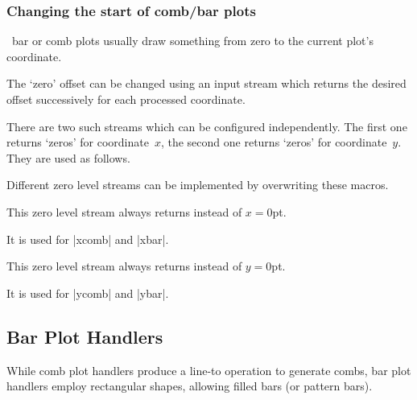 \subsubsection{Changing the start of comb/bar plots}
\pgfname\ bar or comb plots usually draw something from zero to the current plot's coordinate.

The `zero' offset can be changed using an input stream which returns the desired offset successively for each processed coordinate.

There are two such streams which can be configured independently.
The first one returns `zeros' for coordinate~$x$, the second one
returns `zeros' for coordinate~$y$. They are used as follows.

\begin{codeexample}
\pgfplotxzerolevelstreamstart
\pgfplotxzerolevelstreamnext %
\pgfplotxzerolevelstreamnext
\pgfplotxzerolevelstreamnext
\pgfplotxzerolevelstreamend
\end{codeexample}
%
\begin{codeexample}
\pgfplotyzerolevelstreamstart
\pgfplotyzerolevelstreamnext %
\pgfplotyzerolevelstreamend
\end{codeexample}
Different zero level streams can be implemented by overwriting these macros.

\begin{command}{\pgfplotxzerolevelstreamconstant{}}
	This zero level stream always returns  instead of $x=0$pt.

	It is used for |xcomb| and |xbar|.
\end{command}

\begin{command}{\pgfplotyzerolevelstreamconstant{}}
	This zero level stream always returns  instead of $y=0$pt.

	It is used for |ycomb| and |ybar|.
\end{command}

\subsection{Bar Plot Handlers}
\label{section-plotlib-bar-handlers}

While comb plot handlers produce a line-to operation to generate combs, bar plot handlers employ rectangular shapes, allowing filled bars (or pattern bars).

